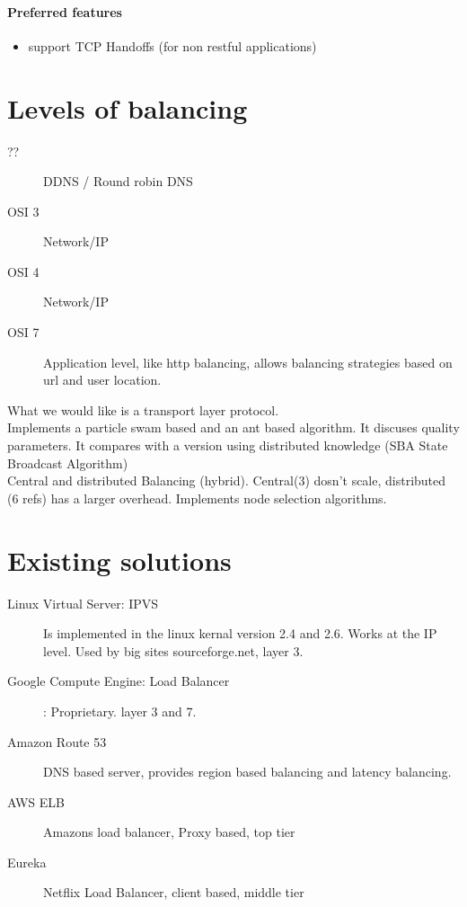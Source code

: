 \paragraph{Preferred features}
\begin{itemize}
	\item support TCP Handoffs (for non restful applications)
\end{itemize}

\section{Levels of balancing}
\begin{description}
	\item[??] DDNS / Round robin DNS
	\item[OSI 3] Network/IP %
	\item[OSI 4] Network/IP
	\item[OSI 7] {Application level, like http balancing, allows balancing strategies based on url and user location.}
\end{description}

What we would like is a transport layer protocol.
\\

\noindent\cite{Ludwig:SwarmIntelligenceGridLoadBalancing} 
Implements a particle swam based and an ant based algorithm. 
It discuses quality parameters.
It compares with a version using distributed knowledge (SBA State Broadcast Algorithm)
\\

\noindent\cite{MayuriMehta:HybridDynamicLB} Central and distributed Balancing (hybrid). Central(3) dosn't scale, distributed (6 refs) has a larger overhead. Implements node selection algorithms.



\section{Existing solutions}
\begin{description}
	\item [Linux Virtual Server: IPVS] Is implemented in the linux kernal version 2.4 and 2.6. Works at the IP level. Used by big sites sourceforge.net, layer 3.
	\item [Google Compute Engine: Load Balancer]: Proprietary. layer 3 and 7.
	\item [Amazon Route 53] DNS based server, provides region based balancing and latency balancing.
	\item [AWS ELB] Amazons load balancer, Proxy based, top tier
	\item [Eureka] Netflix Load Balancer, client based, middle tier
\end{description}

